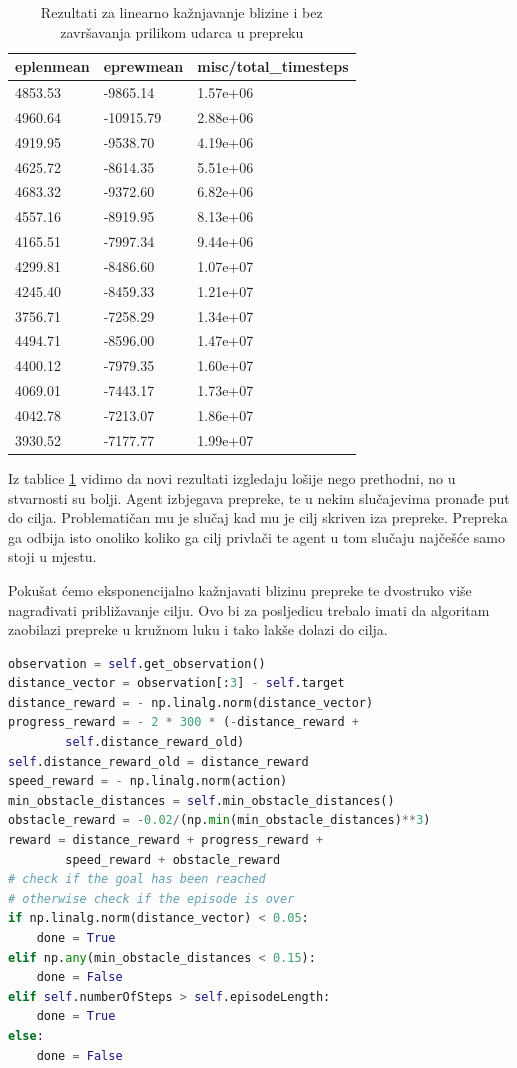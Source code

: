 \documentclass[times,utf8,diplomski]{fer}
\begin{document}
\begin{table}[ht!]
\centering
\caption{Rezultati za linearno kažnjavanje blizine i bez završavanja prilikom udarca u prepreku}
\label{tab:rbk}
\begin{tabular}{@{}lll@{}}
\hline
eplenmean & eprewmean & misc/total\_timesteps \\
\hline
\hline
4853.53 & -9865.14 & 1.57e+06 \\ 
4960.64 & -10915.79 & 2.88e+06 \\
4919.95 & -9538.70 & 4.19e+06 \\ 
4625.72 & -8614.35 & 5.51e+06 \\ 
4683.32 & -9372.60 & 6.82e+06 \\ 
4557.16 & -8919.95 & 8.13e+06 \\ 
4165.51 & -7997.34 & 9.44e+06 \\ 
4299.81 & -8486.60 & 1.07e+07 \\ 
4245.40 & -8459.33 & 1.21e+07 \\ 
3756.71 & -7258.29 & 1.34e+07 \\ 
4494.71 & -8596.00 & 1.47e+07 \\ 
4400.12 & -7979.35 & 1.60e+07 \\ 
4069.01 & -7443.17 & 1.73e+07 \\ 
4042.78 & -7213.07 & 1.86e+07 \\ 
3930.52 & -7177.77 & 1.99e+07 \\ 
\hline
\end{tabular}
\end{table}

Iz tablice  \ref{tab:rbk} vidimo da novi rezultati izgledaju lošije nego prethodni, no u stvarnosti su bolji. Agent izbjegava prepreke, te u nekim slučajevima pronađe put do cilja. Problematičan mu je slučaj kad mu je cilj skriven iza prepreke. Prepreka ga odbija isto onoliko koliko ga cilj privlači te agent u tom slučaju najčešće samo stoji u mjestu.

Pokušat ćemo eksponencijalno kažnjavati blizinu prepreke te dvostruko više nagrađivati približavanje cilju. Ovo bi za posljedicu trebalo imati da algoritam zaobilazi prepreke u kružnom luku i tako lakše dolazi do cilja.

\begin{lstlisting}[caption={Kod za eksponencijalno kažnjavanje blizine i bez završavanja prilikom udarca u prepreku},language=Python]
observation = self.get_observation()
distance_vector = observation[:3] - self.target
distance_reward = - np.linalg.norm(distance_vector)
progress_reward = - 2 * 300 * (-distance_reward +
		self.distance_reward_old)
self.distance_reward_old = distance_reward
speed_reward = - np.linalg.norm(action)
min_obstacle_distances = self.min_obstacle_distances()
obstacle_reward = -0.02/(np.min(min_obstacle_distances)**3)
reward = distance_reward + progress_reward +
		speed_reward + obstacle_reward
# check if the goal has been reached
# otherwise check if the episode is over
if np.linalg.norm(distance_vector) < 0.05:
    done = True
elif np.any(min_obstacle_distances < 0.15):
    done = False
elif self.numberOfSteps > self.episodeLength:
    done = True
else:
    done = False
\end{lstlisting}
\end{document}
